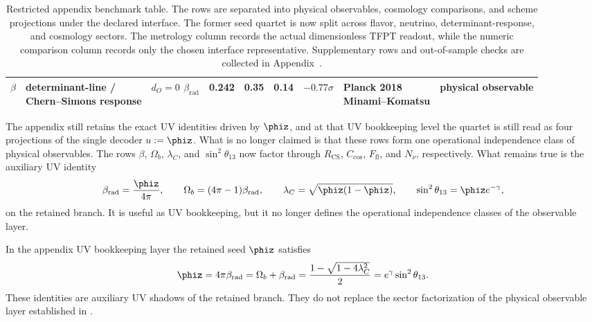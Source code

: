 \begin{table}[t]
{\begin{tabular}{@{}lllrrrrll@{}}
$\beta$ & \makecell[l]{determinant-line /\\Chern--Simons response} & \makecell[l]{$d_O=0$\\$\beta_{\mathrm{rad}}$} & \num{0.242} & \num{0.35} & \num{0.14} & $-0.77\sigma$ & \makecell[l]{Planck 2018\\Minami--Komatsu} & physical observable \\
\bottomrule
\end{tabular}}
\caption{Restricted appendix benchmark table. The rows are separated into physical observables,
cosmology comparisons, and scheme projections under the declared interface. The former seed quartet
is now split across flavor, neutrino, determinant-response, and cosmology sectors. The metrology
column records the actual dimensionless TFPT readout, while the numeric comparison column records
only the chosen interface representative. Supplementary rows and out-of-sample checks are collected
in Appendix~.}
\label{tab:benchmark}
\end{table}

\begin{remark}
The appendix still retains the exact UV identities driven by $\phiz$, and at that UV bookkeeping
level the quartet is still read as four projections of the single decoder $u:=\phiz$. What is no
longer claimed is that these rows form one operational independence class of physical observables.
The rows $\beta$, $\Omega_b$, $\lambda_C$, and $\sin^2\theta_{13}$ now factor through
$R_{\mathrm{CS}}$, $C_{\mathrm{cos}}$, $F_{\mathrm{fl}}$, and $N_\nu$, respectively. What remains
true is the auxiliary UV identity
\[
\beta_{\mathrm{rad}}=\frac{\phiz}{4\pi},
\qquad
\Omega_b=(4\pi-1)\beta_{\mathrm{rad}},
\qquad
\lambda_C=\sqrt{\phiz(1-\phiz)},
\qquad
\sin^2\theta_{13}=\phiz e^{-\gamma},
\]
on the retained branch. It is useful as UV bookkeeping, but it no longer defines the operational
independence classes of the observable layer.
\end{remark}

\begin{corollary}
\label{cor:retained-seed-factorization}
In the appendix UV bookkeeping layer the retained seed $\phiz$ satisfies
\[
\phiz
=
4\pi\beta_{\mathrm{rad}}
=
\Omega_b+\beta_{\mathrm{rad}}
=
\frac{1-\sqrt{1-4\lambda_C^2}}{2}
=
e^{\gamma}\sin^2\theta_{13}.
\]
These identities are auxiliary UV shadows of the retained branch. They do not replace the sector
factorization of the physical observable layer established in
.
\end{corollary}

